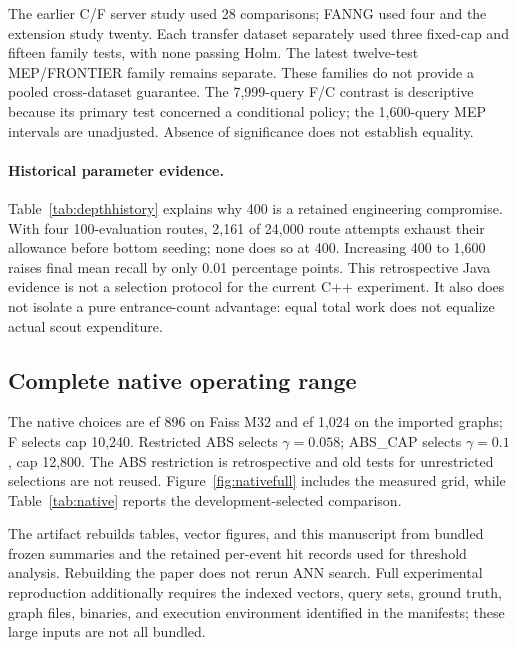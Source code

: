 The earlier C/F server study used 28 comparisons; FANNG used four and the extension study twenty. Each transfer dataset separately used three fixed-cap and fifteen family tests, with none passing Holm. The latest twelve-test MEP/FRONTIER family remains separate. These families do not provide a pooled cross-dataset guarantee. The 7,999-query F/C contrast is descriptive because its primary test concerned a conditional policy; the 1,600-query MEP intervals are unadjusted. Absence of significance does not establish equality.

\paragraph{Historical parameter evidence.}
Table~\ref{tab:depthhistory} explains why 400 is a retained engineering compromise. With four 100-evaluation routes, 2,161 of 24,000 route attempts exhaust their allowance before bottom seeding; none does so at 400. Increasing 400 to 1,600 raises final mean recall by only 0.01 percentage points. This retrospective Java evidence is not a selection protocol for the current C++ experiment. It also does not isolate a pure entrance-count advantage: equal total work does not equalize actual scout expenditure.



\subsection{Complete native operating range}\label{app:nativegrid}

The native choices are ef 896 on Faiss M32 and ef 1,024 on the imported
graphs; F selects cap 10,240. Restricted ABS selects $\gamma=0.058$;
ABS\_CAP selects $\gamma=0.1$, cap 12,800. The ABS restriction is
retrospective and old tests for unrestricted selections are not reused.
Figure~\ref{fig:nativefull} includes the measured grid, while
Table~\ref{tab:native} reports the development-selected comparison.

The artifact rebuilds tables, vector figures, and this manuscript from
bundled frozen summaries and the retained per-event hit records used for
threshold analysis. Rebuilding the paper does not rerun ANN search.
Full experimental reproduction additionally requires the indexed vectors,
query sets, ground truth, graph files, binaries, and execution environment
identified in the manifests; these large inputs are not all bundled.
